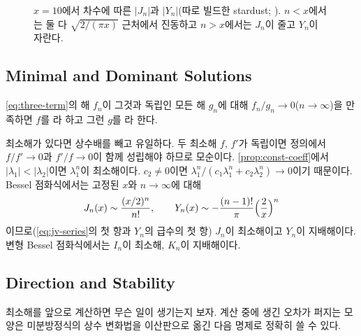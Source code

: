 \begin{figure}[htbp]
\centering
{}
\caption{$x=10$에서 차수에 따른 $|J_n|$과 $|Y_n|$(따로 빌드한 stardust; ). $n<x$에서는 둘 다 $\sqrt{2/(\pi x)}$ 근처에서 진동하고 $n>x$에서는 $J_n$이 줄고 $Y_n$이 자란다.}
\label{fig:bessel-mag}
\end{figure}

\subsection{Minimal and Dominant Solutions}

\begin{definition}
\label{def:minimal}
\cref{eq:three-term}의 해 $f_n$이 그것과 독립인 모든 해 $g_n$에 대해 $f_n/g_n\to0$($n\to\infty$)을 만족하면 $f$를 라 하고 그런 $g$를 라 한다.
\end{definition}

최소해가 있다면 상수배를 빼고 유일하다. 두 최소해 $f$, $f'$가 독립이면 정의에서 $f/f'\to0$과 $f'/f\to0$이 함께 성립해야 하므로 모순이다. \cref{prop:const-coeff}에서 $|\lambda_1|<|\lambda_2|$이면 $\lambda_1^n$이 최소해이다. $c_2\ne0$이면 $\lambda_1^n/(c_1\lambda_1^n+c_2\lambda_2^n)\to0$이기 때문이다. Bessel 점화식에서는 고정된 $x$와 $n\to\infty$에 대해
\[
J_n(x)\sim\frac{(x/2)^n}{n!},\qquad Y_n(x)\sim-\frac{(n-1)!}{\pi}\Bigl(\frac2x\Bigr)^n
\]
이므로(\cref{eq:jv-series}의 첫 항과 $Y_n$의 급수의 첫 항) $J_n$이 최소해이고 $Y_n$이 지배해이다. 변형 Bessel 점화식에서는 $I_n$이 최소해, $K_n$이 지배해이다.

\subsection{Direction and Stability}

최소해를 앞으로 계산하면 무슨 일이 생기는지 보자. 계산 중에 생긴 오차가 퍼지는 모양은 미분방정식의 상수 변화법을 이산판으로 옮긴 다음 명제로 정확히 쓸 수 있다.

